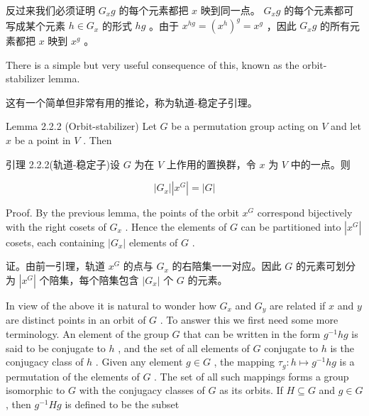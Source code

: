 \documentclass[10pt]{article}
\begin{document}
\begin{tcolorbox}\relax
反过来我们必须证明 \({G}_{x}g\) 的每个元素都把 \(x\) 映到同一点。 \({G}_{x}g\) 的每个元素都可写成某个元素 \(h \in  {G}_{x}\) 的形式 \({hg}\) 。由于 \({x}^{hg} = {\left( {x}^{h}\right) }^{g} = {x}^{g}\) ，因此 \({G}_{x}g\) 的所有元素都把 \(x\) 映到 \({x}^{g}\) 。
\end{tcolorbox}

There is a simple but very useful consequence of this, known as the orbit-stabilizer lemma.

\begin{tcolorbox}\relax
这有一个简单但非常有用的推论，称为轨道-稳定子引理。
\end{tcolorbox}

Lemma 2.2.2 (Orbit-stabilizer) Let \(G\) be a permutation group acting on \(V\) and let \(x\) be a point in \(V\) . Then

\begin{tcolorbox}\relax
引理 2.2.2(轨道-稳定子)设 \(G\) 为在 \(V\) 上作用的置换群，令 \(x\) 为 \(V\) 中的一点。则
\end{tcolorbox}

\[
\left| {G}_{x}\right| \left| {x}^{G}\right|  = \left| G\right|
\]

Proof. By the previous lemma, the points of the orbit \({x}^{G}\) correspond bijectively with the right cosets of \({G}_{x}\) . Hence the elements of \(G\) can be partitioned into \(\left| {x}^{G}\right|\) cosets, each containing \(\left| {G}_{x}\right|\) elements of \(G\) .

\begin{tcolorbox}\relax
证。由前一引理，轨道 \({x}^{G}\) 的点与 \({G}_{x}\) 的右陪集一一对应。因此 \(G\) 的元素可划分为 \(\left| {x}^{G}\right|\) 个陪集，每个陪集包含 \(\left| {G}_{x}\right|\) 个 \(G\) 的元素。
\end{tcolorbox}

In view of the above it is natural to wonder how \({G}_{x}\) and \({G}_{y}\) are related if \(x\) and \(y\) are distinct points in an orbit of \(G\) . To answer this we first need some more terminology. An element of the group \(G\) that can be written in the form \({g}^{-1}{hg}\) is said to be conjugate to \(h\) , and the set of all elements of \(G\) conjugate to \(h\) is the conjugacy class of \(h\) . Given any element \(g \in  G\) , the mapping \({\tau }_{g} : h \mapsto  {g}^{-1}{hg}\) is a permutation of the elements of \(G\) . The set of all such mappings forms a group isomorphic to \(G\) with the conjugacy classes of \(G\) as its orbits. If \(H \subseteq  G\) and \(g \in  G\) , then \({g}^{-1}{Hg}\) is defined to be the subset
\end{document}
